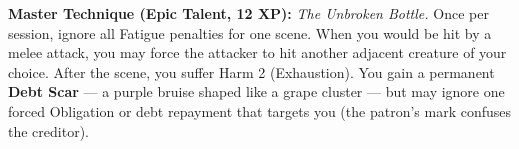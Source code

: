 \begin{tcolorbox}[colback=black!5,colframe=green!50!black,title=\textbf{Drunken Master (Thrysos)},breakable]
  \vspace{2mm}
  \noindent\textbf{Master Technique (Epic Talent, 12 XP):}
  \textit{The Unbroken Bottle.} Once per session, ignore all Fatigue penalties for one scene. When you would be hit by a melee attack, you may force the attacker to hit another adjacent creature of your choice. After the scene, you suffer Harm 2 (Exhaustion). You gain a permanent \textbf{Debt Scar} --- a purple bruise shaped like a grape cluster --- but may ignore one forced Obligation or debt repayment that targets you (the patron's mark confuses the creditor).
\end{tcolorbox}